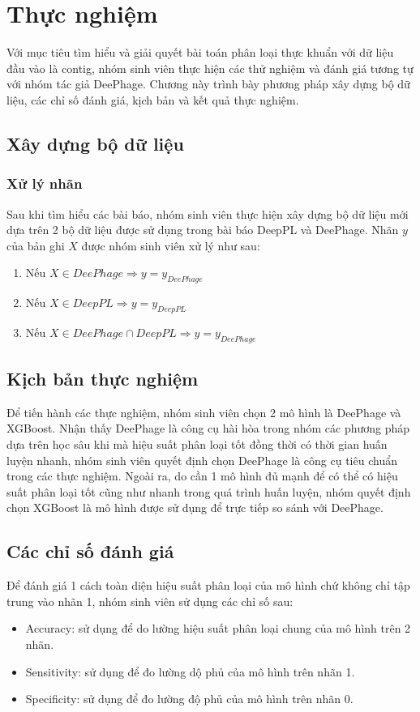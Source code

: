 \chapter{Thực nghiệm}
Với mục tiêu tìm hiểu và giải quyết bài toán phân loại thực khuẩn với dữ liệu đầu vào là contig, nhóm sinh viên thực hiện các thử nghiệm và đánh giá tương tự với nhóm tác giả DeePhage. Chương này trình bày phương pháp xây dựng bộ dữ liệu, các chỉ số đánh giá, kịch bản và kết quả thực nghiệm.

\section{ Xây dựng bộ dữ liệu}
\subsection{ Xử lý nhãn }
Sau khi tìm hiểu các bài báo, nhóm sinh viên thực hiện xây dựng bộ dữ liệu mới dựa trên 2 bộ dữ liệu được sử dụng trong bài báo DeepPL và DeePhage. Nhãn $y$ của bản ghi $X$ được nhóm sinh viên xử lý như sau:
\begin{enumerate}
    \item Nếu $X \in DeePhage \Rightarrow y = y_{DeePhage}$ 
    \item Nếu $X \in DeepPL \Rightarrow y = y_{DeepPL}$
    \item Nếu $X \in DeePhage \cap DeepPL \Rightarrow y = y_{DeePhage}$
\end{enumerate}

\section{Kịch bản thực nghiệm}\label{ kịch bản thực nghiệm}
Để tiến hành các thực nghiệm, nhóm sinh viên chọn 2 mô hình là DeePhage và XGBoost. Nhận thấy DeePhage là công cụ  hài hòa trong nhóm các phương pháp dựa trên học sâu khi mà hiệu suất phân loại tốt đồng thời có thời gian huấn luyện nhanh, nhóm sinh viên quyết định chọn DeePhage là công cụ tiêu chuẩn trong các thực nghiệm. Ngoài ra, do cần 1 mô hình đủ mạnh để có thể có hiệu suất phân loại tốt cũng như nhanh trong quá trình huấn luyện, nhóm quyết định chọn XGBoost là mô hình được sử dụng để trực tiếp so sánh với DeePhage.

\section{Các chỉ số đánh giá}
Để đánh giá 1 cách toàn diện hiệu suất phân loại của mô hình chứ không chỉ tập trung vào nhãn 1, nhóm sinh viên sử dụng các chỉ số sau:
\begin{itemize}
    \item Accuracy: sử dụng để do lường hiệu suất phân loại chung của mô hình trên 2 nhãn.
    \item Sensitivity: sử dụng để đo lường dộ phủ của mô hình trên nhãn 1.
    \item Specificity: sử dụng để đo lường độ phủ của mô hình trên nhãn 0.
\end{itemize}


